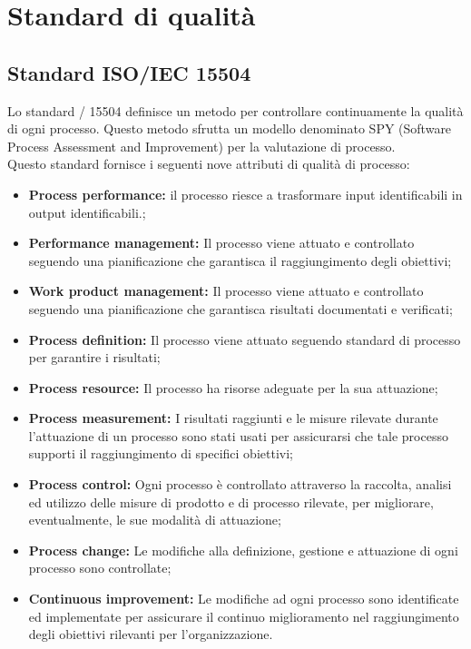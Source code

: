 \documentclass{scalatekids-article}
\begin{document}
\section{Standard di qualità}
\subsection{Standard ISO/IEC 15504}
\label{sec:ISO/IEC15504}
Lo standard / 15504 definisce un metodo per controllare continuamente la qualità di ogni processo. Questo metodo sfrutta un modello denominato SPY (Software Process Assessment and Improvement) per la valutazione di processo.\\
Questo standard fornisce i seguenti nove attributi di qualità di processo:
\begin{itemize}
\item{\textbf{Process performance:} il processo riesce a trasformare input identificabili in output identificabili.;}
\item{\textbf{Performance management:} Il processo viene attuato e controllato seguendo una pianificazione che garantisca il raggiungimento degli obiettivi;}
\item{\textbf{Work product management:} Il processo viene attuato e controllato seguendo una pianificazione che garantisca risultati documentati e verificati;}
\item{\textbf{Process definition:} Il processo viene attuato seguendo standard di processo per garantire i risultati;}
\item{\textbf{Process resource:} Il processo ha risorse adeguate per la sua attuazione;}
\item{\textbf{Process measurement:} I risultati raggiunti e le misure rilevate durante l'attuazione di un processo sono stati usati per assicurarsi che tale processo supporti il raggiungimento di specifici obiettivi;}
\item{\textbf{Process control:} Ogni processo è controllato attraverso la raccolta, analisi ed utilizzo delle misure di prodotto e di processo rilevate, per migliorare, eventualmente, le sue modalità di attuazione;}
\item{\textbf{Process change:} Le modifiche alla definizione, gestione e attuazione di ogni processo sono controllate;}
\item{\textbf{Continuous improvement:} Le modifiche ad ogni processo sono identificate ed implementate per assicurare il continuo miglioramento nel raggiungimento degli obiettivi rilevanti per l'organizzazione.}
\end{itemize}
\end{document}
